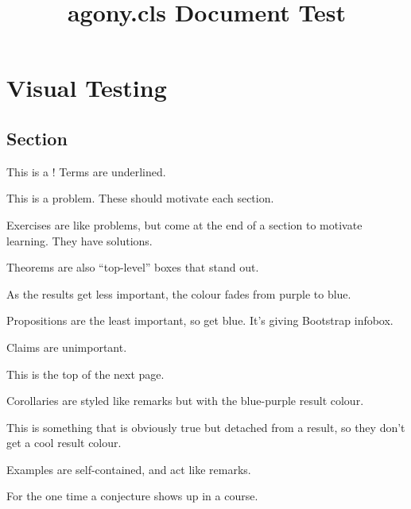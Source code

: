 \documentclass[notes,tikz]{agony}
\title{agony.cls Document Test}
\begin{document}
\chapter{Visual Testing}

\section{Section}

\begin{defn}[term]
  This is a ! Terms are underlined.
\end{defn}

\begin{problem}
  This is a problem. These should motivate each section.
\end{problem}

\begin{xca}
  Exercises are like problems, but come at the end of a section to motivate learning.
  They have solutions.
\end{xca}

\begin{theorem}
  Theorems are also ``top-level'' boxes that stand out.
\end{theorem}

\begin{lemma}
  As the results get less important, the colour fades from purple to blue.
\end{lemma}

\begin{prop}
  Propositions are the least important, so get blue.
  It's giving Bootstrap infobox.
\end{prop}

\begin{claim}
  Claims are unimportant.
\end{claim}

\pagebreak
This is the top of the next page.

\begin{corollary}
  Corollaries are styled like remarks but with the blue-purple result colour.
\end{corollary}

\begin{remark}
  This is something that is obviously true but detached from a result,
  so they don't get a cool result colour.
\end{remark}

\begin{example}
  Examples are self-contained, and act like remarks.
\end{example}

\begin{conjecture}
  For the one time a conjecture shows up in a course.
\end{conjecture}

\pagebreak
\layout
\end{document}
